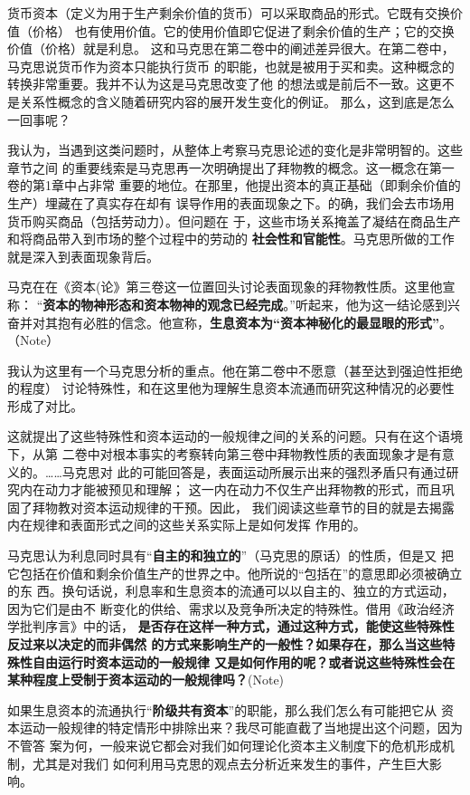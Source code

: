 货币资本（定义为用于生产剩余价值的货币）可以采取商品的形式。它既有交换价值（价格）
也有使用价值。它的使用价值即它促进了剩余价值的生产；它的交换价值（价格）就是利息。
这和马克思在第二卷中的阐述差异很大。在第二卷中，马克思说货币作为资本只能执行货币
的职能，也就是被用于买和卖。这种概念的转换非常重要。我并不认为这是马克思改变了他
的想法或是前后不一致。这更不是关系性概念的含义随着研究内容的展开发生变化的例证。
那么，这到底是怎么一回事呢？

我认为，当遇到这类问题时，从整体上考察马克思论述的变化是非常明智的。这些章节之间
的重要线索是马克思再一次明确提出了拜物教的概念。这一概念在第一卷的第1章中占非常
重要的地位。在那里，他提出资本的真正基础（即剩余价值的生产）埋藏在了真实存在却有
误导作用的表面现象之下。的确，我们会去市场用货币购买商品（包括劳动力）。但问题在
于，这些市场关系掩盖了凝结在商品生产和将商品带入到市场的整个过程中的劳动的
\textbf{社会性和官能性}。马克思所做的工作就是深入到表面现象背后。

马克在在《资本(论》第三卷这一位置回头讨论表面现象的拜物教性质。这里他宣称：
“\textbf{资本的物神形态和资本物神的观念已经完成}。”听起来，他为这一结论感到兴
奋并对其抱有必胜的信念。他宣称，\textbf{生息资本为“资本神秘化的最显眼的形式”}。
（Note）

我认为这里有一个马克思分析的重点。他在第二卷中不愿意（甚至达到强迫性拒绝的程度）
讨论特殊性，和在这里他为理解生息资本流通而研究这种情况的必要性形成了对比。

这就提出了这些特殊性和资本运动的一般规律之间的关系的问题。只有在这个语境下，从第
二卷中对根本事实的考察转向第三卷中拜物教性质的表面现象才是有意义的。……马克思对
此的可能回答是，表面运动所展示出来的强烈矛盾只有通过研究内在动力才能被预见和理解；
这一内在动力不仅生产出拜物教的形式，而且巩固了拜物教对资本运动规律的干预。因此，
我们阅读这些章节的目的就是去揭露内在规律和表面形式之间的这些关系实际上是如何发挥
作用的。

马克思认为利息同时具有“\textbf{自主的和独立的}”（马克思的原话）的性质，但是又
把它包括在价值和剩余价值生产的世界之中。他所说的“包括在”的意思即必须被确立的东
西。换句话说，利息率和生息资本的流通可以以自主的、独立的方式运动，因为它们是由不
断变化的供给、需求以及竞争所决定的特殊性。借用《政治经济学批判序言》中的话，
\textbf{是否存在这样一种方式，通过这种方式，能使这些特殊性反过来以决定的而非偶然
的方式来影响生产的一般性？如果存在，那么当这些特殊性自由运行时资本运动的一般规律
又是如何作用的呢？或者说这些特殊性会在某种程度上受制于资本运动的一般规律吗？}(Note)

\bigskip \hrulefill

如果生息资本的流通执行“\textbf{阶级共有资本}”的职能，那么我们怎么有可能把它从
资本运动一般规律的特定情形中排除出来？我尽可能直截了当地提出这个问题，因为不管答
案为何，一般来说它都会对我们如何理论化资本主义制度下的危机形成机制，尤其是对我们
如何利用马克思的观点去分析近来发生的事件，产生巨大影响。

